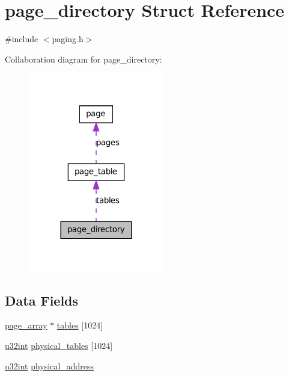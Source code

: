\hypertarget{structpage__directory}{
\section{page\_\-directory Struct Reference}
\label{structpage__directory}
}


{\ttfamily \#include $<$paging.h$>$}



Collaboration diagram for page\_\-directory:\nopagebreak
\begin{figure}[H]
\begin{center}
\leavevmode
\includegraphics[width=168pt]{structpage__directory__coll__graph}
\end{center}
\end{figure}
\subsection*{Data Fields}
\begin{DoxyCompactItemize}
\item 
\hyperlink{structpage__table}{page\_\-array} $\ast$ \hyperlink{structpage__directory_a20d9b0b21070dd2f4b7fe1c8058fc238}{tables} \mbox{[}1024\mbox{]}
\item 
\hyperlink{library_8h_ad7ecf93b77285d9bf039d27fa3f1a588}{u32int} \hyperlink{structpage__directory_aaf911c2f3321b2ec2ad793b652da16fa}{physical\_\-tables} \mbox{[}1024\mbox{]}
\item 
\hyperlink{library_8h_ad7ecf93b77285d9bf039d27fa3f1a588}{u32int} \hyperlink{structpage__directory_a598f67da6db982f143737c0353f12e80}{physical\_\-address}
\end{DoxyCompactItemize}


